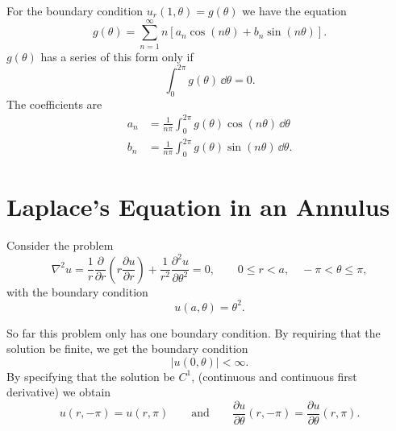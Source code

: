 For the boundary condition $u_r(1,\theta)=g(\theta)$ we have the equation
\[ g(\theta) =  \sum_{n = 1}^\infty n \left[ a_n \cos(n\theta)
  + b_n \sin(n\theta) \right]. \]
$g(\theta)$ has a series of this form only if
\[ \int_0^{2\pi} g(\theta)\,\dd \theta = 0. \]
The coefficients are
\begin{align*}
  a_n &= \frac{1}{n\pi} \int_0^{2\pi} g(\theta) \cos(n\theta)\,\dd \theta \\
  b_n &= \frac{1}{n\pi} \int_0^{2\pi} g(\theta) \sin(n\theta)\,\dd \theta .
\end{align*}












\section{Laplace's Equation in an Annulus}
Consider the problem
\[ \nabla^2 u = \frac{1}{r} \frac{\partial}{\partial r} \left( r \frac{\partial u}{\partial r} \right)
+ \frac{1}{r^2} \frac{\partial^2 u}{\partial \theta^2} = 0,
\qquad 0 \leq r < a, \quad -\pi < \theta \leq \pi, \]
with the boundary condition
\[ u(a,\theta) = \theta^2. \]

\vspace{.1in}

So far this problem only has one boundary condition.  By requiring that the
solution be finite, we get the boundary condition
\[ |u(0,\theta)| < \infty. \]
By specifying that the solution be $C^1$, (continuous and continuous first
derivative) we obtain
\[ u(r,-\pi) = u(r, \pi) \qquad \mathrm{and} \qquad
\frac{\partial u}{\partial \theta}(r, -\pi) = \frac{\partial u}{\partial \theta}(r, \pi). \]

